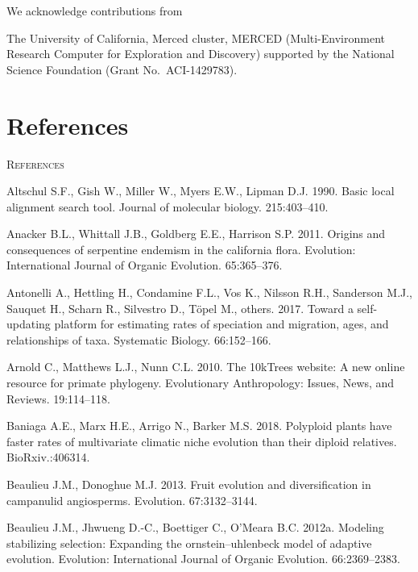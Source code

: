 \documentclass[]{article}
\begin{document}
We acknowledge contributions from

The University of California, Merced cluster, MERCED (Multi-Environment Research Computer for Exploration and Discovery) supported by the National Science Foundation (Grant No.~ACI-1429783).

\hypertarget{references}{%
\section{References}\label{references}}

\newpage
\begin{center}
\textsc{References}
\end{center}

\hypertarget{refs}{}
\leavevmode\hypertarget{ref-altschul1990basic}{}%
Altschul S.F., Gish W., Miller W., Myers E.W., Lipman D.J. 1990. Basic local alignment search tool. Journal of molecular biology. 215:403--410.

\leavevmode\hypertarget{ref-anacker2011origins}{}%
Anacker B.L., Whittall J.B., Goldberg E.E., Harrison S.P. 2011. Origins and consequences of serpentine endemism in the california flora. Evolution: International Journal of Organic Evolution. 65:365--376.

\leavevmode\hypertarget{ref-antonelli2017toward}{}%
Antonelli A., Hettling H., Condamine F.L., Vos K., Nilsson R.H., Sanderson M.J., Sauquet H., Scharn R., Silvestro D., Töpel M., others. 2017. Toward a self-updating platform for estimating rates of speciation and migration, ages, and relationships of taxa. Systematic Biology. 66:152--166.

\leavevmode\hypertarget{ref-arnold201010ktrees}{}%
Arnold C., Matthews L.J., Nunn C.L. 2010. The 10kTrees website: A new online resource for primate phylogeny. Evolutionary Anthropology: Issues, News, and Reviews. 19:114--118.

\leavevmode\hypertarget{ref-baniaga2018polyploid}{}%
Baniaga A.E., Marx H.E., Arrigo N., Barker M.S. 2018. Polyploid plants have faster rates of multivariate climatic niche evolution than their diploid relatives. BioRxiv.:406314.

\leavevmode\hypertarget{ref-beaulieu2013fruit}{}%
Beaulieu J.M., Donoghue M.J. 2013. Fruit evolution and diversification in campanulid angiosperms. Evolution. 67:3132--3144.

\leavevmode\hypertarget{ref-beaulieu2012modeling}{}%
Beaulieu J.M., Jhwueng D.-C., Boettiger C., O'Meara B.C. 2012a. Modeling stabilizing selection: Expanding the ornstein--uhlenbeck model of adaptive evolution. Evolution: International Journal of Organic Evolution. 66:2369--2383.
\end{document}
